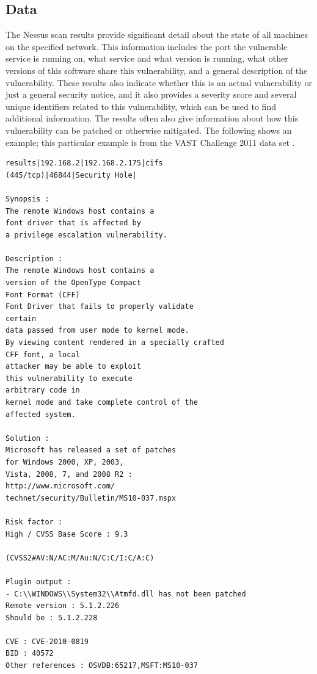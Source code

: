 \documentclass{acm_proc_article-sp}
\begin{document}
\subsection{Data}
The Nessus scan results provide significant detail about the state of all machines on the specified network.
This information includes the port the vulnerable service is running on, what service and what version is running, what other versions of this software share this vulnerability, and a general description of the vulnerability.
These results also indicate whether this is an actual vulnerability or just a general security notice, and it also provides a severity score and several unique identifiers related to this vulnerability, which can be used to find additional information.
The results often also give information about how this vulnerability can be patched or otherwise mitigated. The following shows an example; this particular example is from the VAST Challenge 2011 data set \cite{VAST11}.

\begin{verbatim}
results|192.168.2|192.168.2.175|cifs 
(445/tcp)|46844|Security Hole|

Synopsis :
The remote Windows host contains a 
font driver that is affected by
a privilege escalation vulnerability.

Description :
The remote Windows host contains a 
version of the OpenType Compact
Font Format (CFF) 
Font Driver that fails to properly validate 
certain
data passed from user mode to kernel mode.
By viewing content rendered in a specially crafted 
CFF font, a local
attacker may be able to exploit 
this vulnerability to execute 
arbitrary code in 
kernel mode and take complete control of the 
affected system.

Solution :
Microsoft has released a set of patches 
for Windows 2000, XP, 2003,
Vista, 2008, 7, and 2008 R2 :
http://www.microsoft.com/
technet/security/Bulletin/MS10-037.mspx

Risk factor :
High / CVSS Base Score : 9.3

(CVSS2#AV:N/AC:M/Au:N/C:C/I:C/A:C)

Plugin output :
- C:\\WINDOWS\\System32\\Atmfd.dll has not been patched    
Remote version : 5.1.2.226    
Should be : 5.1.2.228

CVE : CVE-2010-0819
BID : 40572
Other references : OSVDB:65217,MSFT:MS10-037
\end{verbatim}
\end{document}
